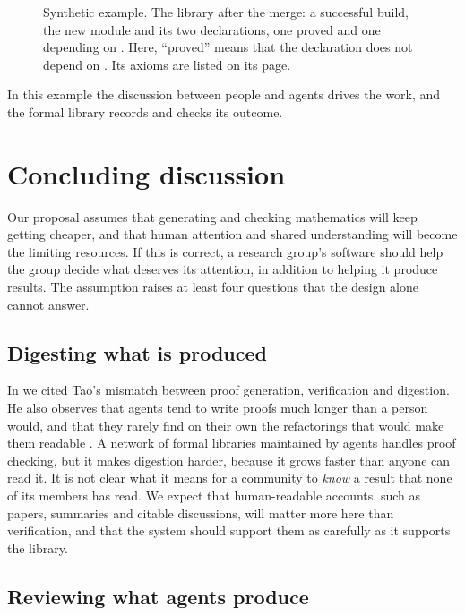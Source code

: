 \documentclass{article}
\begin{document}
\begin{figure}[t]
\centering
{}%
\caption{Synthetic example. The library after the merge: a successful build, the new module and its two declarations, one proved and one depending on . Here, ``proved'' means that the declaration does not depend on . Its axioms are listed on its page.}\label{fig-flujo-libreria}
\end{figure}

In this example the discussion between people and agents drives the work, and the formal library records and checks its outcome.

\section{Concluding discussion}\label{sec-discusion}

Our proposal assumes that generating and checking mathematics will keep getting cheaper, and that human attention and shared understanding will become the limiting resources. If this is correct, a research group's software should help the group decide what deserves its attention, in addition to helping it produce results. The assumption raises at least four questions that the design alone cannot answer.

\subsection*{Digesting what is produced}

In  we cited Tao's mismatch between proof generation, verification and digestion. He also observes that agents tend to write proofs much longer than a person would, and that they rarely find on their own the refactorings that would make them readable \cite{tao2026ieantn}. A network of formal libraries maintained by agents handles proof checking, but it makes digestion harder, because it grows faster than anyone can read it. It is not clear what it means for a community to \emph{know} a result that none of its members has read. We expect that human-readable accounts, such as papers, summaries and citable discussions, will matter more here than verification, and that the system should support them as carefully as it supports the library.

\subsection*{Reviewing what agents produce}
\end{document}
